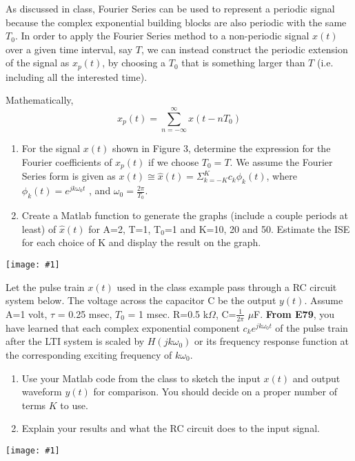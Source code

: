 \documentclass[12pt,letterpaper]{hmcpset}
\newcommand{\diagram}[2]{\begin{center}\texttt{[image: \#1]}\end{center}}
\begin{document}
\afterpage{\null\newpage}

\newpage

\begin{problem}[3]
	As discussed in class, Fourier Series can be used to represent a periodic signal because the
	complex exponential building blocks are also periodic with the same $T_0$. In order to apply
	the Fourier Series method to a non-periodic signal $x(t)$ over a given time interval, say $T$,
	we can instead construct the periodic extension of the signal as $x_p (t)$, by choosing a $T_0$
	that is something larger than $T$ (i.e. including all the interested time).
	
	Mathematically,
	$$ x_p (t) = \sum_{n=-\infty}^{\infty} x(t-nT_0) $$
	\begin{enumerate}
		\item For the signal $x(t)$ shown in Figure 3,  determine the expression for the Fourier
		coefficients of $x_p (t)$ if we choose $T_0 = T$. We assume the Fourier Series form is given
		as $x(t) \cong \widehat{x}(t) = \Sigma_{k=-K}^K c_k \phi_k (t)$, where $\phi_k (t) = e^{jk\omega_0 t}$ , and $\omega_0 = \frac{2\pi}{T_0}$.
		
		\item Create a Matlab function to generate the graphs (include a couple periods at least) of
		$\widehat{x}(t)$ for A=2, T=1, T$_0$=1 and K=10, 20 and 50. Estimate the ISE for each choice of
		K and display the result on the graph.
	\end{enumerate}
	\diagram{Figure_3}{2.5}
\end{problem}

\begin{solution}
	\vfill
\end{solution}

\afterpage{\null\newpage}
\newpage

\begin{problem}[4]
	Let the pulse train $x(t)$ used in the class example pass through a RC circuit system below.
	The voltage across the capacitor C be the output $y(t)$. Assume A=1 volt, $\tau$ =
	0.25 msec, $T_0$ = 1 msec. R=0.5 k$\Omega$, C=$\frac{1}{2\pi}$ $\mu$F. \textbf{From E79}, you have learned that each
	complex exponential component $c_k e^{jk\omega_0 t}$ of the pulse train after the LTI system is scaled
	by $H(jk\omega_0)$ or its frequency response function at the corresponding exciting frequency of
	$k\omega_0$.	
	\begin{enumerate}
		\item Use your Matlab code from the class to sketch the input $x(t)$ and output waveform
		$y(t)$ for comparison. You should decide on a proper number of terms $K$ to use. 
		
		\item Explain your results and what the RC circuit does to the input signal.
	\end{enumerate}
	\diagram{Circuits_4}{4}
\end{problem}

\begin{solution}
	\vfill
\end{solution}
\end{document}
